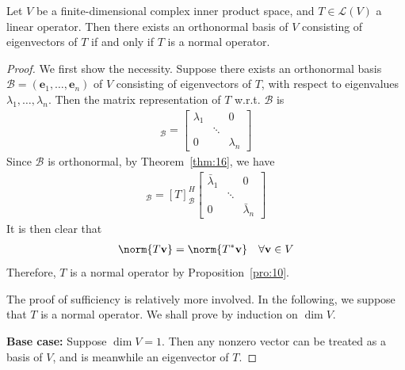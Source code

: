 \documentclass[thmcnt=section, color=blue, 12pt]{my-elegantbook}
\begin{document}
\begin{theorem} \label{thm:15}
	Let $V$ be a finite-dimensional complex inner product space,
	and $T \in \mathcal{L}(V)$ a linear operator.
	Then there exists an orthonormal basis of $V$ consisting
	of eigenvectors of $T$
	if and only if $T$
	is a normal operator.
\end{theorem}

\begin{proof}
	We first show the necessity.
	Suppose there exists an orthonormal 
	basis $\mathcal{B} = (\mathbf{e}_1, \ldots, \mathbf{e}_n)$ 
	of $V$ consisting of eigenvectors of $T$, with respect to 
	eigenvalues $\lambda_1, \ldots, \lambda_n$.
	Then the matrix representation of $T$ w.r.t. $\mathcal{B}$ is 
	\begin{align*}
		[T]_{\mathcal{B}} =
		\begin{bmatrix}
			\lambda_1 & & 0 \\
					  & \ddots & \\
			0 & & \lambda_n
		\end{bmatrix}
	\end{align*}
	Since $\mathcal{B}$ is orthonormal, by Theorem~\ref{thm:16},
	we have 
	\begin{align*}
		[T^\ast]_{\mathcal{B}} =
		[T]^{H}_{\mathcal{B}}
		\begin{bmatrix}
			\bar{\lambda}_1 & & 0 \\
					  & \ddots & \\
			0 & & \bar{\lambda}_n
		\end{bmatrix}
	\end{align*}
	It is then clear that 
	\begin{align*}
		\norm{T \mathbf{v}} = \norm{T^\ast \mathbf{v}}
		\quad \forall \mathbf{v} \in V
	\end{align*}
	Therefore, $T$ is a normal operator by Proposition~\ref{pro:10}.

	The proof of sufficiency is relatively more involved.
	In the following, we suppose that $T$ is a normal operator.
	We shall prove by induction on $\dim V$.

	\noindent \textbf{Base case:} Suppose $\dim V = 1$.
	Then any nonzero vector can be treated as a basis of $V$,
	and is meanwhile an eigenvector of $T$.


\end{proof}
\end{document}
